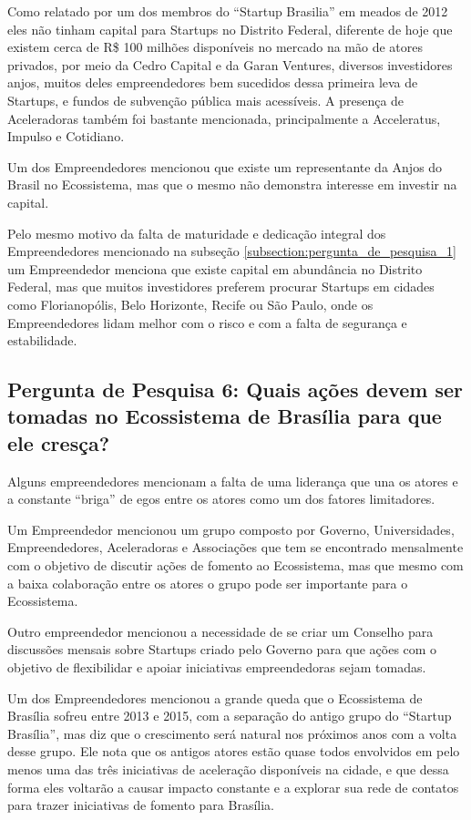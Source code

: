 Como relatado por um dos membros do ``Startup Brasilia'' em meados de 2012 eles não tinham capital para Startups no Distrito Federal, diferente de hoje que existem cerca de R\$ 100 milhões disponíveis no mercado na mão de atores privados, por meio da Cedro Capital e da Garan Ventures, diversos investidores anjos, muitos deles empreendedores bem sucedidos dessa primeira leva de Startups, e fundos de subvenção pública mais acessíveis. A presença de Aceleradoras também foi bastante mencionada, principalmente a Acceleratus, Impulso e Cotidiano. 

Um dos Empreendedores mencionou que existe um representante da Anjos do Brasil no Ecossistema, mas que o mesmo não demonstra interesse em investir na capital.

Pelo mesmo motivo da falta de maturidade e dedicação integral dos Empreendedores mencionado na subseção \ref{subsection:pergunta_de_pesquisa_1} um Empreendedor menciona que existe capital em abundância no Distrito Federal, mas que muitos investidores preferem procurar Startups em cidades como Florianopólis, Belo Horizonte, Recife ou São Paulo, onde os Empreendedores lidam melhor com o risco e com a falta de segurança e estabilidade.

\subsection{Pergunta de Pesquisa 6: Quais ações devem ser tomadas no Ecossistema de Brasília para que ele cresça?}
\label{subsection:pergunta_de_pesquisa_6}

Alguns empreendedores mencionam a falta de uma liderança que una os atores e a constante ``briga'' de egos entre os atores como um dos fatores limitadores.

Um Empreendedor mencionou um grupo composto por Governo, Universidades, Empreendedores, Aceleradoras e Associações que tem se encontrado mensalmente com o objetivo de discutir ações de fomento ao Ecossistema, mas que mesmo com a baixa colaboração entre os atores o grupo pode ser importante para o Ecossistema. 

Outro empreendedor mencionou a necessidade de se criar um Conselho para discussões mensais sobre Startups criado pelo Governo para que ações com o objetivo de flexibilidar e apoiar iniciativas empreendedoras sejam tomadas.

Um dos Empreendedores mencionou a grande queda que o Ecossistema de Brasília sofreu entre 2013 e 2015, com a separação do antigo grupo do ``Startup Brasília'', mas diz que o crescimento será natural nos próximos anos com a volta desse grupo. Ele nota que os antigos atores estão quase todos envolvidos em pelo menos uma das três iniciativas de aceleração disponíveis na cidade, e que dessa forma eles voltarão a causar impacto constante e a explorar sua rede de contatos para trazer iniciativas de fomento para Brasília.